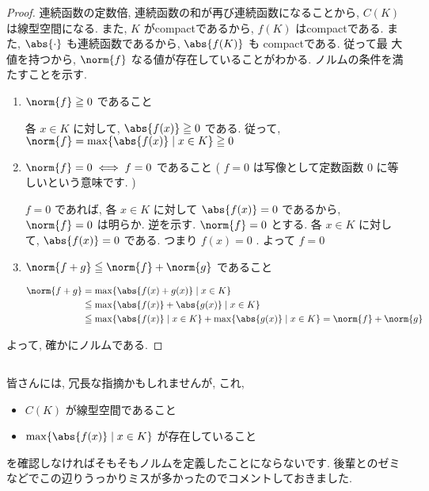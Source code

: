 \begin{leftbar}
    \begin{proof}
        連続函数の定数倍, 連続函数の和が再び連続函数になることから, $C ( K )$ は線型空間になる. また, $K$ がcompactであるから, $f ( K )$ はcompactである. また, $\abs{ \cdot }$ も連続函数であるから, $\abs{ f ( K ) }$ も compactである. 従って最
        大値を持つから, $\norm{ f }$ なる値が存在していることがわかる. ノルムの条件を満たすことを示す.
        \begin{enumerate}
            \item $\norm{ f } \geq 0$ であること

                  \zw 各 $x \in K$ に対して, $\abs{f ( x ) } \geq 0$ である. 従って, $\norm{ f } = \max \{ \abs{ f ( x )} \mid x \in K \} \geq 0$

            \item $\norm{ f } = 0 \iff  f = 0$ であること ( $f = 0$ は写像として定数函数 $0$ に等しいという意味です. )

                  $f = 0$ であれば, 各 $x \in K$ に対して $\abs{ f ( x ) } = 0$ であるから, $\norm{ f } = 0$ は明らか. 逆を示す. $\norm{ f } = 0$ とする. 各 $x \in K$ に対して, $\abs{ f ( x ) } = 0$ である. つまり $f ( x ) = 0$ . よって $f = 0$

            \item $\norm{ f + g } \leq \norm{ f } + \norm{ g }$ であること

                  \begin{align*}
                      \norm{ f + g } & =  \max \{ \abs{ f ( x ) + g ( x )} \mid x \in K \}                                                                   \\
                                     & \leq  \max \{ \abs{ f ( x ) } + \abs{ g ( x ) } \mid x \in K \}                                                       \\
                                     & \leqq   \max \{ \abs{ f ( x ) }  \mid x \in K \} + \max \{ \abs{ g ( x ) }  \mid x \in K \} = \norm{ f } + \norm{ g }
                  \end{align*}
        \end{enumerate}
        よって, 確かにノルムである.
    \end{proof}
\end{leftbar}

\begin{column}
    皆さんには, 冗長な指摘かもしれませんが, これ,
    \begin{itemize}
        \item $C ( K )$ が線型空間であること
        \item $\max \{ \abs{ f ( x )} \mid x \in K \}$ が存在していること
    \end{itemize}
    を確認しなければそもそもノルムを定義したことにならないです. 後輩とのゼミなどでこの辺りうっかりミスが多かったのでコメントしておきました.
\end{column}

